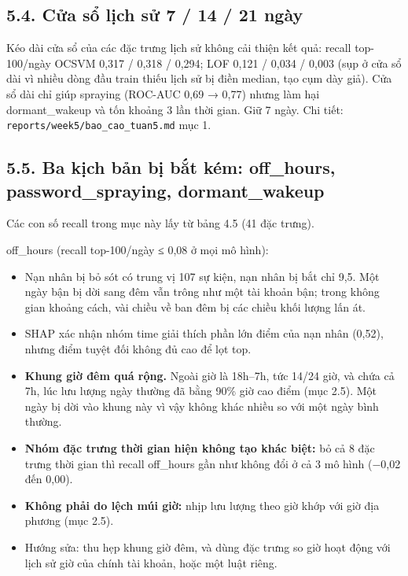 \documentclass[
  11pt,
]{article}
\providecommand{\tightlist}{%
  \setlength{\itemsep}{0pt}\setlength{\parskip}{0pt}}
\begin{document}
\hypertarget{cux1eeda-sux1ed5-lux1ecbch-sux1eed-7-14-21-nguxe0y}{%
\subsection{5.4. Cửa sổ lịch sử 7 / 14 / 21
ngày}\label{cux1eeda-sux1ed5-lux1ecbch-sux1eed-7-14-21-nguxe0y}}

Kéo dài cửa sổ của các đặc trưng lịch sử không cải thiện kết quả: recall
top-100/ngày OCSVM 0,317 / 0,318 / 0,294; LOF 0,121 / 0,034 / 0,003 (sụp
ở cửa sổ dài vì nhiều dòng đầu train thiếu lịch sử bị điền median, tạo
cụm dày giả). Cửa sổ dài chỉ giúp spraying (ROC-AUC 0,69 → 0,77) nhưng
làm hại dormant\_\allowbreak{}wakeup và tốn khoảng 3 lần thời gian. Giữ
7 ngày. Chi tiết:
\texttt{reports/\allowbreak{}week5/\allowbreak{}bao\_\allowbreak{}cao\_\allowbreak{}tuan5.\allowbreak{}md}
mục 1.

\hypertarget{ba-kux1ecbch-bux1ea3n-bux1ecb-bux1eaft-kuxe9m-off_hours-password_spraying-dormant_wakeup}{%
\subsection{\texorpdfstring{5.5. Ba kịch bản bị bắt kém:
off\_\allowbreak{}hours, password\_\allowbreak{}spraying,
dormant\_\allowbreak{}wakeup}{5.5. Ba kịch bản bị bắt kém:   }}\label{ba-kux1ecbch-bux1ea3n-bux1ecb-bux1eaft-kuxe9m-off_hours-password_spraying-dormant_wakeup}}

Các con số recall trong mục này lấy từ bảng 4.5 (41 đặc trưng).

off\_\allowbreak{}hours (recall top-100/ngày ≤ 0,08 ở mọi mô hình):

\begin{itemize}
\tightlist
\item
  Nạn nhân bị bỏ sót có trung vị 107 sự kiện, nạn nhân bị bắt chỉ 9,5.
  Một ngày bận bị dời sang đêm vẫn trông như một tài khoản bận; trong
  không gian khoảng cách, vài chiều về ban đêm bị các chiều khối lượng
  lấn át.
\item
  SHAP xác nhận nhóm time giải thích phần lớn điểm của nạn nhân (0,52),
  nhưng điểm tuyệt đối không đủ cao để lọt top.
\item
  \textbf{Khung giờ đêm quá rộng.} Ngoài giờ là 18h--7h, tức 14/24 giờ,
  và chứa cả 7h, lúc lưu lượng ngày thường đã bằng 90\% giờ cao điểm
  (mục 2.5). Một ngày bị dời vào khung này vì vậy không khác nhiều so
  với một ngày bình thường.
\item
  \textbf{Nhóm đặc trưng thời gian hiện không tạo khác biệt:} bỏ cả 8
  đặc trưng thời gian thì recall off\_\allowbreak{}hours gần như không
  đổi ở cả 3 mô hình (−0,02 đến 0,00).
\item
  \textbf{Không phải do lệch múi giờ:} nhịp lưu lượng theo giờ khớp với
  giờ địa phương (mục 2.5).
\item
  Hướng sửa: thu hẹp khung giờ đêm, và dùng đặc trưng so giờ hoạt động
  với lịch sử giờ của chính tài khoản, hoặc một luật riêng.
\end{itemize}
\end{document}
